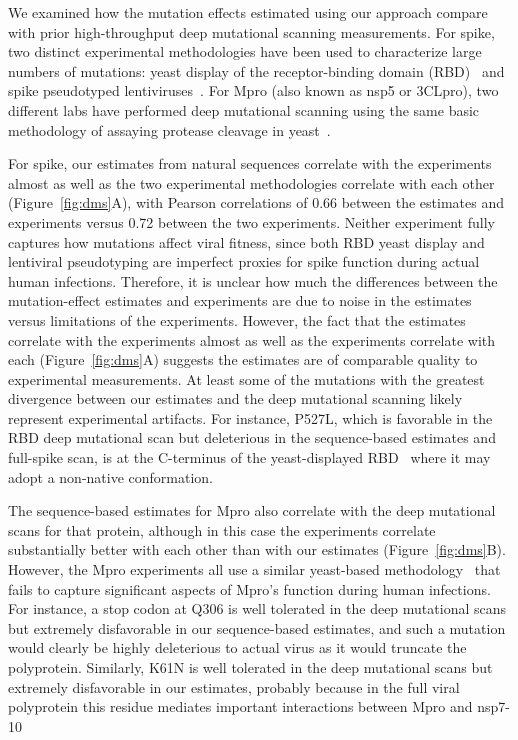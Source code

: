 \documentclass[9pt,twocolumn,twoside]{gsajnl_modified}
\begin{document}
We examined how the mutation effects estimated using our approach compare with prior high-throughput deep mutational scanning measurements.
For spike, two distinct experimental methodologies have been used to characterize large numbers of mutations: yeast display of the receptor-binding domain (RBD)~\citep{starr2020deep,starr2022deep} and spike pseudotyped lentiviruses~\citep{dadonaite2023pseudovirus}.
For Mpro (also known as nsp5 or 3CLpro), two different labs have performed deep mutational scanning using the same basic methodology of assaying protease cleavage in yeast~\citep{flynn2022,flynn2023,iketani2022functional}.

For spike, our estimates from natural sequences correlate with the experiments almost as well as the two experimental methodologies correlate with each other (Figure~\ref{fig:dms}A), with Pearson correlations of 0.66 between the estimates and experiments versus 0.72 between the two experiments.
Neither experiment fully captures how mutations affect viral fitness, since both RBD yeast display and lentiviral pseudotyping are imperfect proxies for spike function during actual human infections.
Therefore, it is unclear how much the differences between the mutation-effect estimates and experiments are due to noise in the estimates versus limitations of the experiments.
However, the fact that the estimates correlate with the experiments almost as well as the experiments correlate with each (Figure~\ref{fig:dms}A) suggests the estimates are of comparable quality to experimental measurements.
At least some of the mutations with the greatest divergence between our estimates and the deep mutational scanning likely represent experimental artifacts.
For instance, P527L, which is favorable in the RBD deep mutational scan but deleterious in the sequence-based estimates and full-spike scan, is at the C-terminus of the yeast-displayed RBD~\citep{starr2020deep} where it may adopt a non-native conformation.

The sequence-based estimates for Mpro also correlate with the deep mutational scans for that protein, although in this case the experiments correlate substantially better with each other than with our estimates (Figure~\ref{fig:dms}B).
However, the Mpro experiments all use a similar yeast-based methodology~\citep{flynn2022,flynn2023,iketani2022functional} that fails to capture significant aspects of Mpro's function during human infections.
For instance, a stop codon at Q306 is well tolerated in the deep mutational scans but extremely disfavorable in our sequence-based estimates, and such a mutation would clearly be highly deleterious to actual virus as it would truncate the polyprotein.
Similarly, K61N is well tolerated in the deep mutational scans but extremely disfavorable in our estimates, probably because in the full viral polyprotein this residue mediates important interactions between Mpro and nsp7-10~\citep{yadav2022biochemical}
\end{document}
